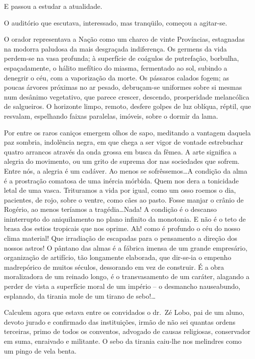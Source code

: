 E passou a estudar a atualidade. 

O auditório que
escutava, interessado, mas tranqüilo, começou a agitar{}-se. 

O orador
representava a Nação como um charco de vinte Províncias, estagnadas na
modorra paludosa da mais desgraçada indiferença. Os germens da vida
perdem{}-se na vasa profunda; à superfície de coágulos de putrefação,
borbulha, espaçadamente, o hálito mefítico do miasma, fermentado ao
sol, subindo a denegrir o céu, com a vaporização da morte. Os pássaros
calados fogem; as poucas árvores próximas no ar pesado, debruçam{}-se
uniformes sobre si mesmas num desânimo vegetativo, que parece crescer,
descendo, prosperidade melancólica de salgueiros. O horizonte limpo,
remoto, desfere golpes de luz oblíqua, réptil, que resvalam, espelhando
faixas paralelas, imóveis, sobre o dormir da lama. 

Por entre os raros
caniços emergem olhos de sapo, meditando a vantagem daquela paz
sombria, indolência negra, em que chega a ser vigor de vontade estrebuchar 
quatro arrancos através da onda grossa em busca da fêmea. A arte significa a
alegria do movimento, ou um grito de suprema dor nas sociedades que
sofrem. Entre nós, a alegria é um cadáver. Ao menos se sofrêssemos\ldots A
condição da alma é a prostração comatosa de uma inércia mórbida. Quem
nos dera a tonicidade letal de uma vasca. Trituramos a vida por igual, 
como um osso roemos o dia, pacientes, de rojo, sobre o ventre, como
cães ao pasto. Fosse manjar o crânio de Rogério, ao menos teríamos a
tragédia\ldots Nada! A condição é o descanso ininterrupto do aniquilamento
no plano infinito da monotonia. E não é o teto de brasa dos estios
tropicais que nos oprime. Ah! como é profundo o céu do nosso clima
material! Que irradiação de escapadas para o pensamento a direção dos
nossos astros! O pântano das almas é a fábrica imensa de um grande
empresário, organização de artifício, tão longamente elaborada, que
dir{}-se{}-ia o empenho madrepórico de muitos séculos, dessorando em vez
de construir. É a obra moralizadora de um reinado longo, é o
transvasamento de um caráter, alagando a perder de vista a superfície
moral de um império -- o desmancho nauseabundo, esplanado, da tirania
mole de um tirano de sebo!\ldots 

Calculem agora que estava entre os
convidados o dr.~Zé Lobo, pai de um aluno, devoto jurado e confirmado
das instituições, irmão de não sei quantas ordens terceiras, primo de
todos os conventos, advogado de causas religiosas, conservador em suma,
enraivado e militante. O sebo da tirania caiu{}-lhe nos melindres como um
pingo de vela benta. 

